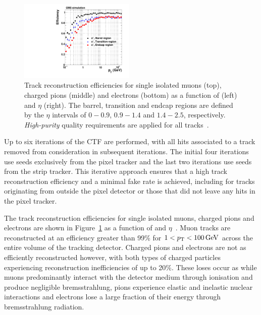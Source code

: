 \begin{figure}[htbp]
\includegraphics[width=0.49\textwidth]{figs/data-mc/chargedParticles/SingleParticles/el/efficiencyVsPt.pdf}
\caption{Track reconstruction efficiencies for single isolated muons (top), charged pions (middle) and electrons (bottom) as a function of \pT (left) and $\eta$ (right). The barrel, transition and endcap regions are defined by the $\eta$ intervals of $0-0.9$, $0.9-1.4$ and $1.4-2.5$, respectively. \emph{High-purity} quality requirements are applied for all tracks~\cite{Chatrchyan:2014fea}.}
\label{fig:chargedParticleRecoEfficiency}
\end{figure}

Up to six iterations of the CTF are performed, with all hits associated to a track removed from consideration in subsequent iterations.
The initial four iterations use seeds exclusively from the pixel tracker and the last two iterations use seeds from the strip tracker.
This iterative approach ensures that a high track reconstruction efficiency and a minimal fake rate is achieved, including for tracks originating from outside the pixel detector or those that did not leave any hits in the pixel tracker.

The track reconstruction efficiencies for single isolated muons, charged pions and electrons are shown in Figure~\ref{fig:chargedParticleRecoEfficiency} as a function of \pT and $\eta$~\cite{Chatrchyan:2014fea}.
Muon tracks are reconstructed at an efficiency greater than 99\% for $1 < p_{\mathrm{T}}  < 100\,\text{Ge\hspace{-.08em}V}$ across the entire volume of the tracking detector.
Charged pions and electrons are not as efficiently reconstructed however, with both types of charged particles experiencing reconstruction inefficiencies of up to 20\%.   
These loses occur as while muons predominantly interact with the detector medium through ionisation and produce negligible bremsstrahlung, pions experience elastic and inelastic nuclear interactions and electrons lose a large fraction of their energy through bremsstrahlung radiation.

